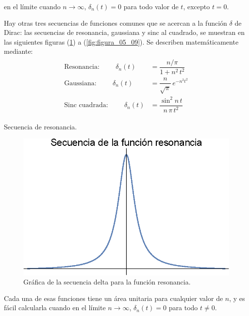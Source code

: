 \documentclass[12pt]{article}
\numberwithin{equation}{section}
\begin{document}
en el límite cuando $n \to \infty$, $\delta_{n}(t) = 0$ para todo valor de $t$, excepto $t = 0$. 
\par
Hay otras tres secuencias de funciones comunes que se acercan a la función $\delta$ de Dirac: las secuencias de resonancia, gaussiana y sinc al cuadrado, se muestran en las siguientes figuras (\ref{fig:figura_05_07}) a (\ref{fig:figura_05_09}). Se describen matemáticamente mediante:
\begin{align}
\begin{aligned}
\mbox{Resonancia:} \hspace{1cm} \delta_{n}(t) &= \dfrac{n/\pi}{1 + n^{2} \, t^{2}} \\[1em]
\mbox{Gaussiana:} \hspace{1cm} \delta_{n}(t) &= \dfrac{n}{\sqrt{\pi}} \, e^{-n^{2} t^{2}} \\[1em]
\mbox{Sinc cuadrada:} \hspace{1cm} \delta_{n}(t) &= \dfrac{\sin^{2} n \, t}{n \, \pi \, t^{2}} 
\end{aligned}
\label{eq:ecuacion_05_13}
\end{align}

Secuencia de resonancia.
\begin{figure}[H]
    \centering
    \includegraphics[scale=1]{Imagenes/secuencia_Delta_05.eps}
    \caption{Gráfica de la secuencia delta para la función resonancia.}
    \label{fig:figura_05_07}
\end{figure}
Cada una de esas funciones tiene un área unitaria para cualquier valor de $n$, y es fácil calcularla cuando en el límite $n \to \infty$, $\delta_{n} (t) = 0$ para todo $t \neq 0$.
\end{document}
